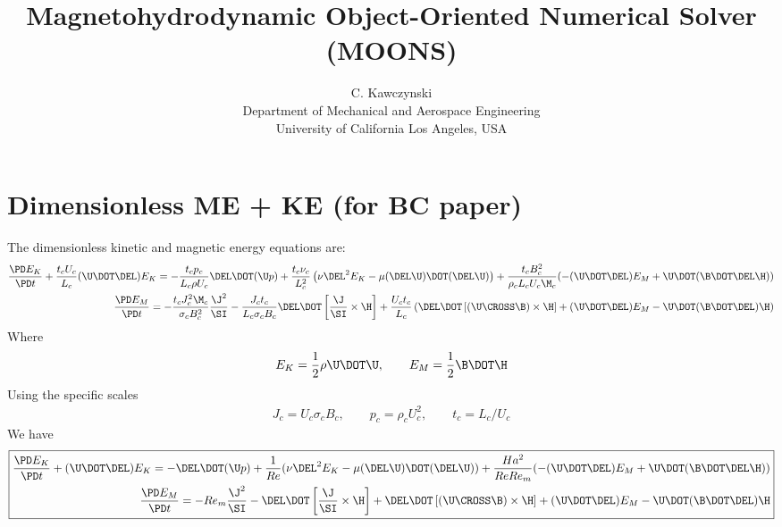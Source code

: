 \documentclass[11pt]{article}
\begin{document}
\doublespacing
\title{Magnetohydrodynamic Object-Oriented Numerical Solver (MOONS)}
\author{C. Kawczynski \\
Department of Mechanical and Aerospace Engineering \\
University of California Los Angeles, USA\\
}
\maketitle

\section{Dimensionless ME + KE (for BC paper)}
The dimensionless kinetic and magnetic energy equations are:
\begin{equation}\begin{aligned}
	\frac{\PD E_K}{\PD t}
	+ \frac{t_c U_c}{L_c} (\U \DOT \DEL) E_K
	=
	- \frac{t_c p_c}{L_c \rho U_c} \DEL \DOT (\U p)
	+ \frac{t_c \nu_c}{L_c^2}
	\left( \nu \DEL^2 E_K -  \mu (\DEL \U) \DOT (\DEL \U) \right)
	+ \frac{t_c B_c^2}{\rho_c L_c U_c \M_c}
	( - (\U \DOT \DEL) E_M + \U \DOT (\B \DOT \DEL \H) ) \\
	\frac{\PD E_M}{\PD t} =
	- \frac{t_c J_c^2 \M_c}{\sigma_c B_c^2} \frac{\J^2}{\SI}
	- \frac{J_c t_c}{L_c \sigma_c B_c} \DEL \DOT \left[\frac{\J}{\SI} \times \H \right]
	+ \frac{U_c t_c}{L_c}
	\left(
	\DEL \DOT \left[\left(\U \CROSS \B \right) \times \H \right]
	+ (\U \DOT \DEL) E_M
	- \U \DOT (\B \DOT \DEL) \H
	\right)
\end{aligned}\end{equation}
Where
\begin{equation}
	E_K = \frac{1}{2} \rho \U \DOT \U, \qquad E_M = \frac{1}{2} \B \DOT \H
\end{equation}
Using the specific scales
\begin{equation}\begin{aligned}
	J_c = U_c \sigma_c B_c, \qquad
	p_c = \rho_c U_c^2, \qquad
	t_c = L_c / U_c
\end{aligned}\end{equation}
We have
\begin{equation}\boxed{\begin{aligned}
	\frac{\PD E_K}{\PD t}
	+ (\U \DOT \DEL) E_K
	=
	- \DEL \DOT (\U p)
	+ \frac{1}{Re} ( \nu \DEL^2 E_K -  \mu (\DEL \U) \DOT (\DEL \U) )
	+ \frac{Ha^2}{Re Re_m} (  - (\U \DOT \DEL) E_M + \U \DOT (\B \DOT \DEL \H) )
	\\
	\frac{\PD E_M}{\PD t} =
	- Re_m \frac{\J^2}{\SI}
	- \DEL \DOT \left[\frac{\J}{\SI} \times \H \right]
	+
	\DEL \DOT \left[\left(\U \CROSS \B \right) \times \H \right]
	+ (\U \DOT \DEL) E_M - \U \DOT (\B \DOT \DEL) \H
\end{aligned}}\end{equation}
\end{document}
